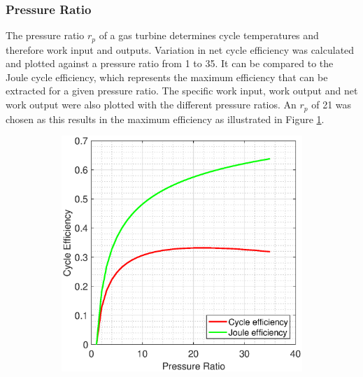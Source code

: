 \subsubsection{Pressure Ratio} 
The pressure ratio $r_p$ of a gas turbine determines cycle temperatures and therefore work input and outputs. Variation in net cycle efficiency was calculated and plotted against a pressure ratio from 1 to 35. It can be compared to the Joule cycle efficiency, which represents the maximum efficiency that can be extracted for a given pressure ratio. The specific work input, work output and net work output were also plotted with the different pressure ratios. An $r_p$ of 21 was chosen as this results in the maximum efficiency as illustrated in Figure \ref{fig:efficiencysimple}.
 \begin{figure} [h]
\centering
\begin{subfigure}{.7\textwidth}
\centering
 \includegraphics[width=0.9\linewidth]{./pictures/efficiencysimple.eps}
  \label{fig:efficiencysimple}
\end{subfigure}
\begin{subfigure}{.7\textwidth}
 \centering

\end{subfigure}
\end{figure}
